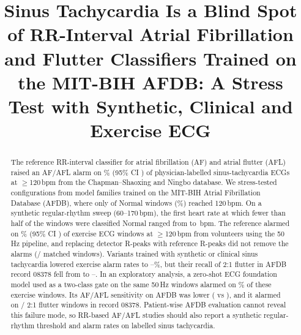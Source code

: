 \documentclass[conference,a4paper]{IEEEtran}
\begin{document}

\title{Sinus Tachycardia Is a Blind Spot of RR-Interval Atrial Fibrillation and Flutter Classifiers Trained on the MIT-BIH
AFDB: A Stress Test with Synthetic, Clinical and Exercise ECG}

\ifblind
\author{
}
\else
\author{\IEEEauthorblockN{[Author 1], [Author 2], [Author 3], [Supervisor]}
}
\fi

\maketitle

\begin{abstract}
The reference RR-interval classifier for atrial fibrillation (AF) and atrial flutter (AFL) raised an AF/AFL alarm on
\chapPtwo\% (95\% CI \chapPtwoCI) of \chapNhi{} physician-labelled sinus-tachycardia ECGs at $\geq$120\,bpm from the
Chapman--Shaoxing and Ningbo database. We stress-tested \nCfgAfdb{} configurations from \nFam{} model families trained on the
MIT-BIH Atrial Fibrillation Database (AFDB), where only \nAfdbHi{} of \nNormalAfdb{} Normal windows (\pctAfdbHi\%) reached
120\,bpm. On a synthetic regular-rhythm sweep (60--170\,bpm), the first heart rate at which fewer than half of the windows
were classified Normal ranged from \thrMin{} to \thrMax\,bpm. The reference alarmed on \exPtwo\% (95\% CI \exPtwoCI) of
\nWinEx{} exercise ECG windows at $\geq$120\,bpm from \nSubjEx{} volunteers using the 50\,Hz pipeline, and replacing detector
R-peaks with reference R-peaks did not remove the alarms (\nPairAlarmRef/\nPairWin{} matched windows).
Variants trained with synthetic or clinical sinus tachycardia lowered exercise alarm rates to \exVeightC--\exVsevenB\%, but
their recall of 2:1 flutter in AFDB record 08378 fell from \rPtwo{} to \rVeightA--\rVsevenA. In an exploratory analysis,
a zero-shot ECG foundation model used as a two-class gate on the same 50\,Hz windows alarmed on \gateExHi\% of these exercise
windows. Its AF/AFL sensitivity on AFDB was lower (\gateAfdbSe{} vs \ptwoAfdbSe), and it alarmed on
\gateEightThreeHit/\nEightThreeAfl{} 2:1 flutter windows in record 08378. Patient-wise AFDB evaluation cannot reveal this
failure mode, so RR-based AF/AFL studies should also report a synthetic regular-rhythm threshold and alarm rates on labelled
sinus tachycardia.
\end{abstract}
\end{document}
